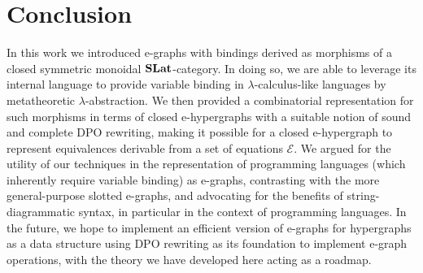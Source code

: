 \documentclass[acmsmall,screen, nonacm, review, anonymous]{acmart}
\begin{document}
\section{Conclusion}
In this work we introduced e-graphs with bindings derived as morphisms of a closed symmetric monoidal $\mathbf{SLat}$-category.
In doing so, we are able to leverage its internal language to provide variable binding in $\lambda$-calculus-like languages by metatheoretic $\lambda$-abstraction.
We then provided a combinatorial representation for such morphisms in terms of closed e-hypergraphs with a suitable notion of sound and complete DPO rewriting, making it possible for a closed e-hypergraph to represent equivalences derivable from a set of equations $\mathcal{E}$.
We argued for the utility of our techniques in the representation of programming languages (which inherently require variable binding) as e-graphs, contrasting with the more general-purpose slotted e-graphs, and advocating for the benefits of string-diagrammatic syntax, in particular in the context of programming languages.
In the future, we hope to implement an efficient version of e-graphs for hypergraphs as a data structure using DPO rewriting as its foundation to implement e-graph operations, with the theory we have developed here acting as a roadmap.




\appendix


\end{document}
